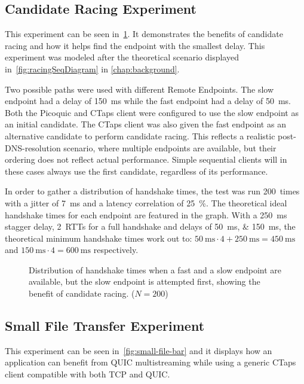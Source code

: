 \subsection{Candidate Racing Experiment}\label{sec:handshake-kde}
This experiment can be seen in~\cref{fig:handshake-kde}. It
demonstrates the benefits of candidate racing and how it helps find the
endpoint with the smallest delay.
This experiment was modeled after the theoretical
scenario displayed in~\cref{fig:racingSeqDiagram} in \cref{chap:background}.

Two possible paths were used with different Remote Endpoints.
The slow endpoint had a delay of \qty{150}{\milli\second}
while the fast endpoint had a delay of \qty{50}{\milli\second}.
Both the Picoquic
and CTaps client were configured to use the slow endpoint as an initial candidate.
The CTaps client was also given the fast endpoint as an alternative candidate to
perform candidate racing. This reflects a realistic post-DNS-resolution
scenario, where multiple endpoints are available, but their ordering
does not reflect actual performance. Simple sequential clients will in these
cases always use the first candidate, regardless of its performance.

In order to gather a distribution of handshake times, the test was run 200~times with a
jitter of \qty{7}{\milli\second} and a latency correlation of \qty{25}{\percent}.
The theoretical ideal handshake times for each endpoint are featured
in the graph. With a \qty{250}{\milli\second} stagger delay, 2~RTTs for a full handshake and delays of
\qtylist{50;150}{\milli\second},
the theoretical minimum handshake times work out to:
$\qty{50}{\milli\second} \cdot 4 + \qty{250}{\milli\second} = \qty{450}{\milli\second}$
and
$\qty{150}{\milli\second} \cdot 4 = \qty{600}{\milli\second}$ respectively. 

\begin{figure}[H]
    
    \caption[Candidate racing experiment]{Distribution of handshake times when a fast and a slow endpoint are available, but the slow
    endpoint is attempted first, showing the benefit of candidate racing. ($N = 200$)}
    \label{fig:handshake-kde}
\end{figure}

\subsection{Small File Transfer Experiment}\label{sec:smallfiletransfer}
This experiment can be seen in~\cref{fig:small-file-bar} and it
displays how an application can benefit
from QUIC multistreaming while using a generic CTaps client
compatible with both TCP and QUIC.

